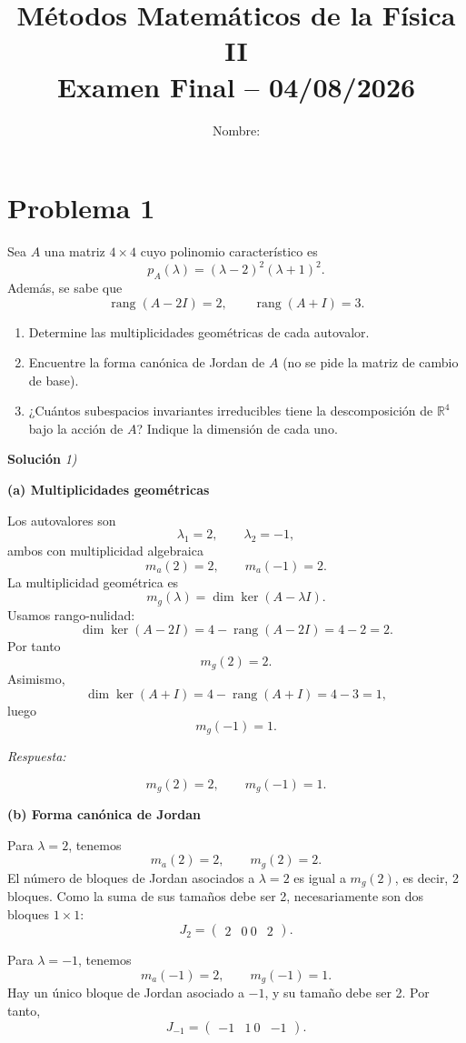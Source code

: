 \documentclass[12pt]{article}
\title{\textbf{Métodos Matemáticos de la Física II} \\ Examen Final – 04/08/2026}
\author{Nombre: \underline{\hspace{6cm}}}
\date{}
\begin{document}
\maketitle

\section*{Problema 1}
Sea \(A\) una matriz \(4 \times 4\) cuyo polinomio característico es
\[
p_A(\lambda) = (\lambda - 2)^2(\lambda + 1)^2.
\]
Además, se sabe que
\[
\operatorname{rang}(A - 2I) = 2, \qquad \operatorname{rang}(A + I) = 3.
\]
\begin{enumerate}
    \item[(a)] Determine las multiplicidades geométricas de cada autovalor.
    \item[(b)] Encuentre la forma canónica de Jordan de \(A\) (no se pide la matriz de cambio de base).
    \item[(c)] ¿Cuántos subespacios invariantes irreducibles tiene la descomposición de \(\mathbb{R}^4\) bajo la acción de \(A\)? Indique la dimensión de cada uno.
\end{enumerate}

\vspace{0.5cm}
{\bf Soluci\'on }{\em 1)}
\vspace{0.5cm}

{\bf (a) Multiplicidades geométricas}

Los autovalores son
$$
\lambda_1=2,\qquad \lambda_2=-1,
$$
ambos con multiplicidad algebraica
$$
m_a(2)=2,\qquad m_a(-1)=2.
$$
La multiplicidad geométrica es
$$
m_g(\lambda)=\dim\ker(A-\lambda I).
$$
Usamos rango-nulidad:
$$
\dim\ker(A-2I)
=
4-\operatorname{rang}(A-2I)
=
4-2
=
2.
$$
Por tanto
$$
m_g(2)=2.
$$
Asimismo,
$$
\dim\ker(A+I)
=
4-\operatorname{rang}(A+I)
=
4-3
=
1,
$$
luego
$$
m_g(-1)=1.
$$

{\em Respuesta:}

$$
\boxed{m_g(2)=2,\qquad m_g(-1)=1.}
$$

{\bf (b) Forma canónica de Jordan}

Para $\lambda=2$, tenemos
$$
m_a(2)=2,\qquad m_g(2)=2.
$$
El número de bloques de Jordan asociados a $\lambda=2$ es igual a $m_g(2)$, es decir, 2 bloques.
Como la suma de sus tamaños debe ser 2, necesariamente son dos bloques $1\times 1$:
$$
J_{2}=
\begin{pmatrix}
2&0\
0&2
\end{pmatrix}.
$$

Para $\lambda=-1$, tenemos
$$
m_a(-1)=2,\qquad m_g(-1)=1.
$$
Hay un único bloque de Jordan asociado a $-1$, y su tamaño debe ser 2.
Por tanto,
$$
J_{-1}
=
\begin{pmatrix}
-1&1\
0&-1
\end{pmatrix}.
$$
\end{document}
